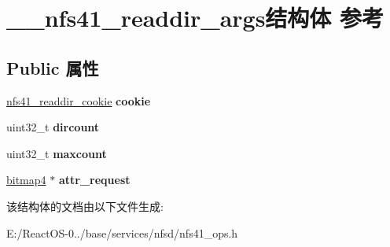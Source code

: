 \hypertarget{struct____nfs41__readdir__args}{}\section{\+\_\+\+\_\+nfs41\+\_\+readdir\+\_\+args结构体 参考}
\label{struct____nfs41__readdir__args}
\subsection*{Public 属性}
\begin{DoxyCompactItemize}
\item 
\mbox{\label{struct____nfs41__readdir__args_a6cf56c289b9c3e93e59c1475cd400fca}} 
\hyperlink{struct____nfs41__readdir__cookie}{nfs41\+\_\+readdir\+\_\+cookie} {\bfseries cookie}
\item 
\mbox{\label{struct____nfs41__readdir__args_a94517242ef8e9e5b969a25a7782eeecf}} 
uint32\+\_\+t {\bfseries dircount}
\item 
\mbox{\label{struct____nfs41__readdir__args_a393847bd7d4967826e24dc4e27eed40f}} 
uint32\+\_\+t {\bfseries maxcount}
\item 
\mbox{\label{struct____nfs41__readdir__args_a1048d5dcb26041b7e597da0bc82f39ae}} 
\hyperlink{struct____bitmap4}{bitmap4} $\ast$ {\bfseries attr\+\_\+request}
\end{DoxyCompactItemize}


该结构体的文档由以下文件生成\+:\begin{DoxyCompactItemize}
\item 
E\+:/\+React\+O\+S-\/0../base/services/nfsd/nfs41\+\_\+ops.\+h\end{DoxyCompactItemize}
